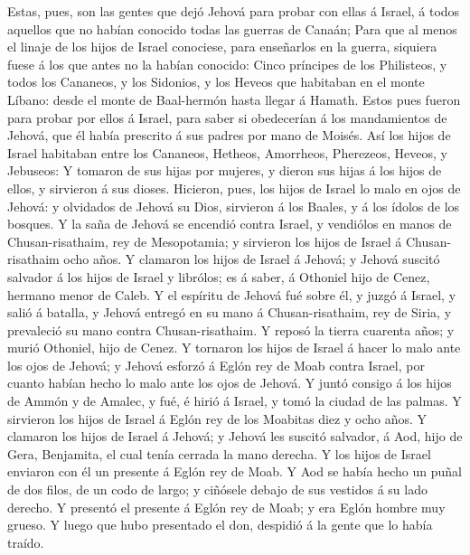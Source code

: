  Estas, pues, son las gentes que dejó Jehová para probar con
ellas á Israel, á todos aquellos que no habían conocido todas las
guerras de Canaán;  Para que al menos el linaje de los hijos
de Israel conociese, para enseñarlos en la guerra, siquiera fuese á los
que antes no la habían conocido:  Cinco príncipes de los
Philisteos, y todos los Cananeos, y los Sidonios, y los Heveos que
habitaban en el monte Líbano: desde el monte de Baal-hermón hasta llegar
á Hamath.  Estos pues fueron para probar por ellos á Israel,
para saber si obedecerían á los mandamientos de Jehová, que él había
prescrito á sus padres por mano de Moisés.  Así los hijos de
Israel habitaban entre los Cananeos, Hetheos, Amorrheos, Pherezeos,
Heveos, y Jebuseos:  Y tomaron de sus hijas por mujeres, y
dieron sus hijas á los hijos de ellos, y sirvieron á sus dioses.
 Hicieron, pues, los hijos de Israel lo malo en ojos de
Jehová: y olvidados de Jehová su Dios, sirvieron á los Baales, y á los
ídolos de los bosques.  Y la saña de Jehová se encendió
contra Israel, y vendiólos en manos de Chusan-risathaim, rey de
Mesopotamia; y sirvieron los hijos de Israel á Chusan-risathaim ocho
años.  Y clamaron los hijos de Israel á Jehová; y Jehová
suscitó salvador á los hijos de Israel y librólos; es á saber, á
Othoniel hijo de Cenez, hermano menor de Caleb.  Y el
espíritu de Jehová fué sobre él, y juzgó á Israel, y salió á batalla, y
Jehová entregó en su mano á Chusan-risathaim, rey de Siria, y prevaleció
su mano contra Chusan-risathaim.  Y reposó la tierra
cuarenta años; y murió Othoniel, hijo de Cenez.  Y tornaron
los hijos de Israel á hacer lo malo ante los ojos de Jehová; y Jehová
esforzó á Eglón rey de Moab contra Israel, por cuanto habían hecho lo
malo ante los ojos de Jehová.  Y juntó consigo á los hijos
de Ammón y de Amalec, y fué, é hirió á Israel, y tomó la ciudad de las
palmas.  Y sirvieron los hijos de Israel á Eglón rey de los
Moabitas diez y ocho años.  Y clamaron los hijos de Israel
á Jehová; y Jehová les suscitó salvador, á Aod, hijo de Gera, Benjamita,
el cual tenía cerrada la mano derecha. Y los hijos de Israel enviaron
con él un presente á Eglón rey de Moab.  Y Aod se había
hecho un puñal de dos filos, de un codo de largo; y ciñósele debajo de
sus vestidos á su lado derecho.  Y presentó el presente á
Eglón rey de Moab; y era Eglón hombre muy grueso.  Y luego
que hubo presentado el don, despidió á la gente que lo había traído.

